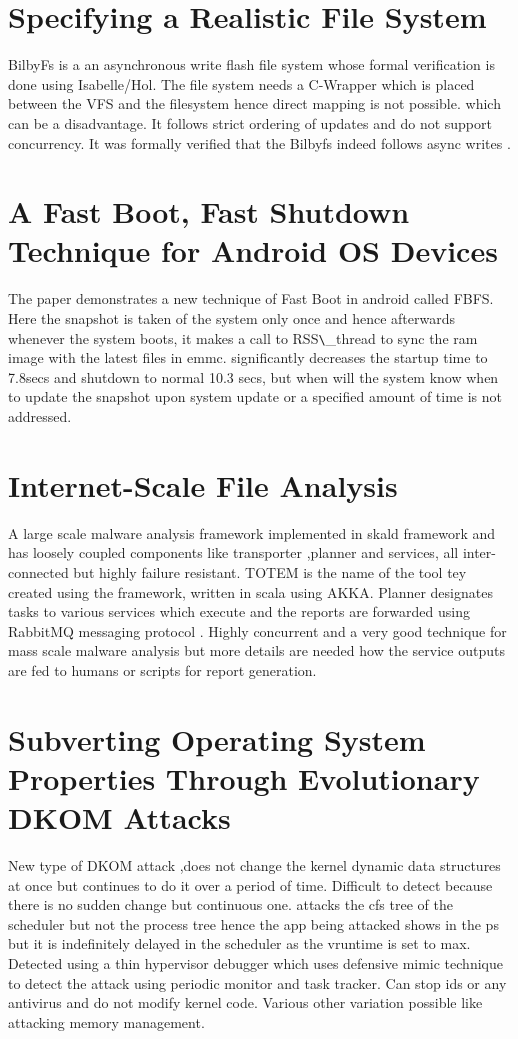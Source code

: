 \section{Specifying a Realistic File System }
BilbyFs\cite{amani_murray_2015} is a an asynchronous write flash file system whose formal verification is done using Isabelle/Hol. The file system needs a C-Wrapper which is placed between the VFS and the filesystem hence direct mapping is not possible. which can be a disadvantage. It follows strict ordering of updates and do not support concurrency. It was formally verified that the Bilbyfs indeed follows async writes .

\section{A Fast Boot, Fast Shutdown Technique for Android OS Devices}
The paper \cite{yang_shi_sun_zheng_alves-foss_2016} demonstrates a new technique of Fast Boot in android called FBFS. Here the snapshot is taken of the system only once and hence afterwards whenever the system boots, it makes a call to RSS\verb+\+\_thread to sync the ram image with the latest files in emmc. significantly decreases the startup time to 7.8secs and shutdown to normal 10.3 secs, but when will the system know when to update the snapshot upon system update or a specified amount of time is not addressed.



\section{Internet-Scale File Analysis}
A \cite{hanif_lengyel_webster_2015} large scale malware analysis framework implemented in skald framework and has loosely coupled components like transporter ,planner and services, all inter-connected but highly failure resistant. TOTEM is the name of the tool tey created using the framework, written in scala using AKKA. Planner designates tasks to various services which execute and the reports are forwarded using RabbitMQ messaging protocol . Highly concurrent and a very good technique for mass scale malware analysis but more details are needed how the service outputs are fed to humans or scripts for report generation.


\section{Subverting Operating System Properties Through Evolutionary DKOM Attacks}
 \cite{graziano_flore_lanzi_balzarotti_2016}New type of DKOM attack ,does not change the kernel dynamic data structures at once but continues to do it over a period of time. Difficult to detect because there is no sudden change but continuous one. attacks the cfs tree of the scheduler but not the process tree hence the app being attacked shows in the ps but it is indefinitely delayed in the scheduler as the vruntime is set to max. Detected using a thin hypervisor debugger which uses defensive mimic technique to detect the attack using periodic monitor and task tracker. Can stop ids or any antivirus and do not modify kernel code. Various other variation possible like attacking memory management.

